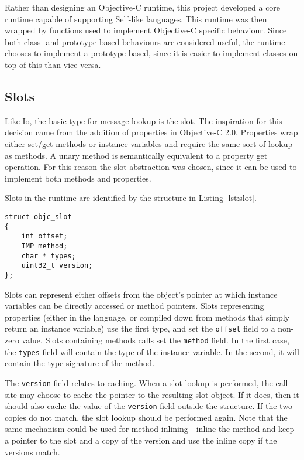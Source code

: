\documentclass[10pt]{article}
\newcommand{\code}[1]{\lstinline|#1|}
\begin{document}
			Rather than designing an Objective-C runtime, this project developed a core runtime capable of supporting Self-like languages.  This runtime was then wrapped by functions used to implement Objective-C specific behaviour.  Since both class- and prototype-based behaviours are considered useful, the runtime chooses to implement a prototype-based, since it is easier to implement classes on top of this than vice versa.  

			\subsection{Slots}
				
				Like Io, the basic type for message lookup is the slot.  The inspiration for this decision came from the addition of properties in Objective-C 2.0.  Properties wrap either set/get methods or instance variables and require the same sort of lookup as methods.  A unary method is semantically equivalent to a property get operation.  For this reason the slot abstraction was chosen, since it can be used to implement both methods and properties.

				Slots in the runtime are identified by the structure in Listing \ref{lst:slot}.

				\begin{lstlisting}[caption={Structure used to represent a slot.},label={lst:slot}]
struct objc_slot
{
    int offset;
    IMP method;
    char * types;
    uint32_t version;
};
				\end{lstlisting}

				Slots can represent either offsets from the object's pointer at which instance variables can be directly accessed or method pointers.  Slots representing properties (either in the language, or compiled down from methods that simply return an instance variable) use the first type, and set the \code{offset} field to a non-zero value.  Slots containing methods calls set the \code{method} field.  In the first case, the \code{types} field will contain the type of the instance variable.  In the second, it will contain the type signature of the method.   

				The \code{version} field relates to caching.  When a slot lookup is performed, the call site may choose to cache the pointer to the resulting slot object.  If it does, then it should also cache the value of the \code{version} field outside the structure.  If the two copies do not match, the slot lookup should be performed again.  Note that the same mechanism could be used for method inlining---inline the method and keep a pointer to the slot and a copy of the version and use the inline copy if the versions match.
\end{document}
